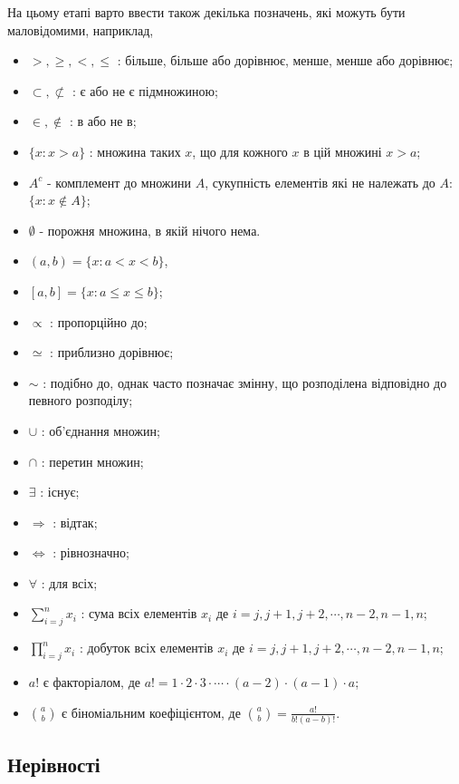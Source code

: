 \documentclass[
  11pt,
]{book}
\providecommand{\tightlist}{%
  \setlength{\itemsep}{0pt}\setlength{\parskip}{0pt}}
\begin{document}
На цьому етапі варто ввести також декілька позначень, які можуть бути маловідомими, наприклад,

\begin{itemize}
\tightlist
\item
  \(>, \geq, <, \leq\) : більше, більше або дорівнює, менше, менше або дорівнює;
\item
  \(\subset, \not\subset\) : є або не є підмножиною;
\item
  \(\in, \notin\) : в або не в;
\item
  \(\{x : x > a\}\) : множина таких \(x\), що для кожного \(x\) в цій множині \(x>a\);
\item
  \(A^c\) - комплемент до множини \(A\), сукупність елементів які не належать до \(A\): \(\{x: x \notin A\}\);
\item
  \(\emptyset\) - порожня множина, в якій нічого нема.
\item
  \((a, b) = \{x:a<x<b\}\),
\item
  \([a, b] = \{x:a \leq x \leq b\}\);
\item
  \(\propto\) : пропорційно до;
\item
  \(\simeq\) : приблизно дорівнює;
\item
  \(\sim\) : подібно до, однак часто позначає змінну, що розподілена відповідно до певного розподілу;
\item
  \(\cup\) : об'єднання множин;
\item
  \(\cap\) : перетин множин;
\item
  \(\exists\) : існує;
\item
  \(\Rightarrow\) : відтак;
\item
  \(\iff\) : рівнозначно;
\item
  \(\forall\) : для всіх;
\item
  \(\sum\limits_{i=j}^{n}x_i\) : сума всіх елементів \(x_i\) де \(i = j, j+1, j+2, \cdots, n-2, n-1, n\);
\item
  \(\prod\limits_{i=j}^{n}x_i\) : добуток всіх елементів \(x_i\) де \(i = j, j+1, j+2, \cdots, n-2, n-1, n\);
\item
  \(a!\) є факторіалом, де \(a! = 1 \cdot 2 \cdot 3 \cdot \cdots \cdot (a-2) \cdot (a-1) \cdot a\);
\item
  \(\binom{a}{b}\) є біноміальним коефіцієнтом, де \(\binom{a}{b} = \frac{a!}{b!(a-b)!}\).
\end{itemize}

\subsection{Нерівності}\label{ux43dux435ux440ux456ux432ux43dux43eux441ux442ux456}
\end{document}
